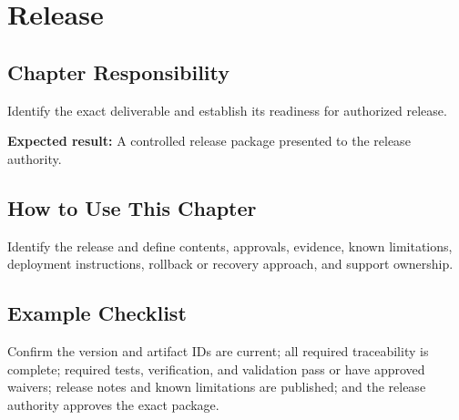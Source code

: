\chapter{Release}
\section{Chapter Responsibility}
\label{Section:ReleaseResponsibility}
Identify the exact deliverable and establish its readiness for authorized release.

\noindent\textbf{Expected result:} A controlled release package presented to the release authority.

\section{How to Use This Chapter}
Identify the release and define contents, approvals, evidence, known limitations, deployment instructions, rollback or recovery approach, and support ownership.
\section{Example Checklist}
Confirm the version and artifact IDs are current; all required traceability is complete; required tests, verification, and validation pass or have approved waivers; release notes and known limitations are published; and the release authority approves the exact package.
